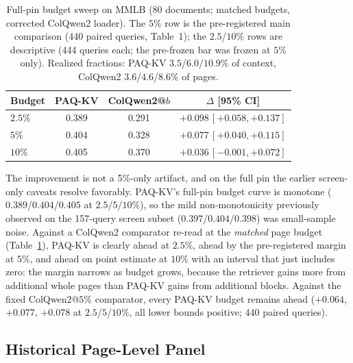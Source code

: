 \documentclass[letterpaper]{article} %
\newcommand{\paqc}{\textsc{PAQ-KV}}
\begin{document}
\begin{table}[t]
\centering\small
\setlength{\tabcolsep}{2.5pt}%
\begin{tabular}{lccc}
\toprule
Budget & \paqc{} & ColQwen2@$b$ & $\Delta$ [95\% CI] \\
\midrule
$2.5\%$ & 0.389 & 0.291 & $+0.098\,[+0.058,+0.137]$ \\
$5\%$   & 0.404 & 0.328 & $+0.077\,[+0.040,+0.115]$ \\
$10\%$  & 0.405 & 0.370 & $+0.036\,[-0.001,+0.072]$ \\
\bottomrule
\end{tabular}
\caption{Full-pin budget sweep on MMLB (80 documents; matched budgets, corrected ColQwen2 loader). The $5\%$ row is the pre-registered main comparison (440 paired queries, Table~1); the $2.5$/$10\%$ rows are descriptive (444 queries each; the pre-frozen bar was frozen at $5\%$ only). Realized fractions: \paqc{} $3.5$/$6.0$/$10.9\%$ of context, ColQwen2 $3.6$/$4.6$/$8.6\%$ of pages.}
\label{tab:budget-sweep}
\end{table}

The improvement is not a 5\%-only artifact, and on the full pin the earlier screen-only caveats resolve favorably. \paqc{}'s full-pin budget curve is monotone ($0.389$/$0.404$/$0.405$ at $2.5$/$5$/$10\%$), so the mild non-monotonicity previously observed on the 157-query screen subset ($0.397$/$0.404$/$0.398$) was small-sample noise. Against a ColQwen2 comparator re-read at the \emph{matched} page budget (Table~\ref{tab:budget-sweep}), \paqc{} is clearly ahead at $2.5\%$, ahead by the pre-registered margin at $5\%$, and ahead on point estimate at $10\%$ with an interval that just includes zero: the margin narrows as budget grows, because the retriever gains more from additional whole pages than \paqc{} gains from additional blocks. Against the fixed ColQwen2@$5\%$ comparator, every \paqc{} budget remains ahead ($+0.064$, $+0.077$, $+0.078$ at $2.5$/$5$/$10\%$, all lower bounds positive; 440 paired queries).

\subsection{Historical Page-Level Panel}\label{app:panel}
\end{document}
